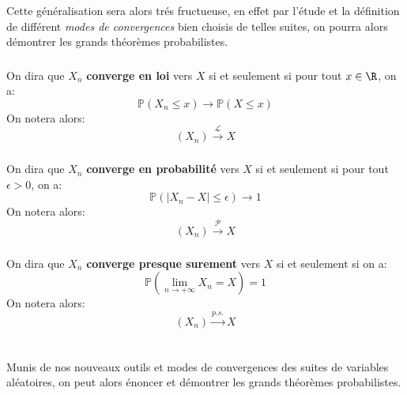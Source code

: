 Cette généralisation sera alors trés fructueuse, en effet par l'étude et la définition de différent \textit{modes de convergences} bien choisis de telles suites, on pourra alors démontrer les grands théorèmes probabilistes.

\subsection*{}
On dira que \(X_n\) \textbf{converge en loi} vers \(X\) si et seulement si pour tout \(x \in \R\), on a:
\[
   \mathbb{P}(X_n \leq x) \longrightarrow \mathbb{P}(X \leq x)
\]
On notera alors:
\[
   (X_n) \overset{\mathcal{L}}{\longrightarrow} X
\]

\subsection*{}
On dira que \(X_n\) \textbf{converge en probabilité} vers \(X\) si et seulement si pour tout \(\epsilon > 0\), on a:
\[
   \mathbb{P}(|X_n - X| \leq \epsilon) \longrightarrow 1
\]
On notera alors:
\[
   (X_n) \overset{\mathcal{P}}{\longrightarrow} X
\]

\subsection*{}
On dira que \(X_n\) \textbf{converge presque surement} vers \(X\) si et seulement si on a:
\[
   \mathbb{P}\left(\lim_{n \rightarrow +\infty} X_n = X \right) = 1
\]
On notera alors:
\[
   (X_n) \overset{p.s.}{\longrightarrow} X
\]

\subsection*{}
\chapter*{} %

Munis de nos nouveaux outils et modes de convergences des suites de variables aléatoires, on peut alors énoncer et démontrer les grands théorèmes probabilistes.

